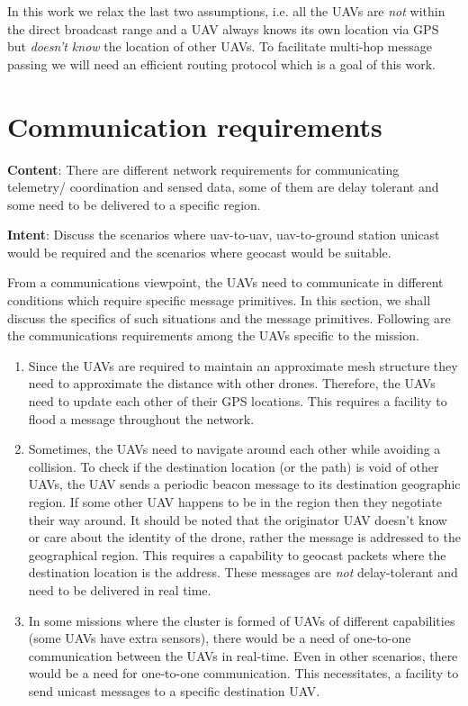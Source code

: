In this work we relax the last two assumptions, i.e. all the UAVs are \emph{not} within the direct broadcast range and a UAV always knows its own location via GPS but \emph{doesn't know} the location of other UAVs. To facilitate multi-hop message passing we will need an efficient routing protocol which is a goal of this work.

\section{Communication requirements} \label{comm_reqs}
\textbf{Content}: There are different network requirements for communicating telemetry/ coordination and sensed data, some of them are delay tolerant and some need to be delivered to a specific region.

\textbf{Intent}: Discuss the scenarios where uav-to-uav, uav-to-ground station unicast would be required and the scenarios where geocast would be suitable. 

From a communications viewpoint, the UAVs need to communicate in different conditions which require specific message primitives. In this section, we shall discuss the specifics of such situations and the message primitives. Following are the communications requirements among the UAVs specific to the mission.
\begin{enumerate}
\item Since the UAVs are required to maintain an approximate mesh structure they need to approximate the distance with other drones. Therefore, the UAVs need to update each other of their GPS locations. This requires a facility to flood a message throughout the network. 

\item Sometimes, the UAVs need to navigate around each other while avoiding a collision. To check if the destination location (or the path) is void of other UAVs, the UAV sends a periodic beacon message to its destination geographic region. If some other UAV happens to be in the region then they negotiate their way around. It should be noted that the originator UAV doesn't know or care about the identity of the drone, rather the message is addressed to the geographical region. This requires a capability to geocast packets where the destination location is the address. These messages are \emph{not} delay-tolerant and need to be delivered in real time.
\item In some missions where the cluster is formed of UAVs of different capabilities (some UAVs have extra sensors), there would be a need of one-to-one communication between the UAVs in real-time. Even in other scenarios, there would be a need for one-to-one communication. This necessitates, a facility to send unicast messages to a specific destination UAV.
\end{enumerate}

